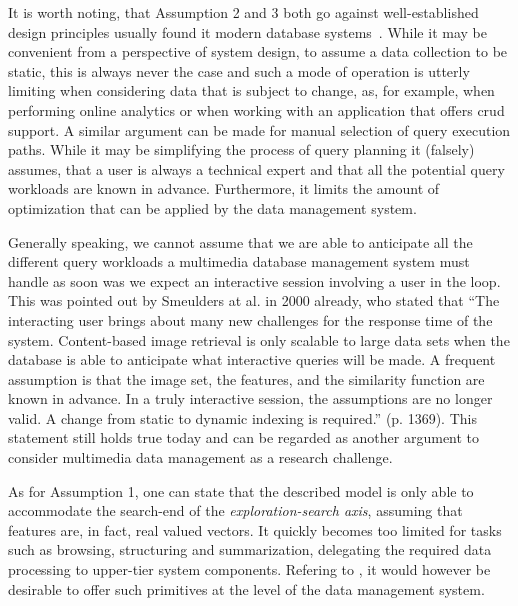 It is worth noting, that Assumption 2 and 3 both go against well-established design principles usually found it modern database systems~\cite{Petrov:2019Database}. While it may be convenient from a perspective of system design, to assume a data collection to be static, this is always never the case and such a mode of operation is utterly limiting when considering data that is subject to change, as, for example, when performing online analytics or when working with an application that offers \acrshort{crud} support. A similar argument can be made for manual selection of query execution paths. While it may be simplifying the process of query planning it (falsely) assumes, that a user is always a technical expert and that all the potential query workloads are known in advance. Furthermore, it limits the amount of optimization that can be applied by the data management system. 

Generally speaking, we cannot assume that we are able to anticipate all the different query workloads a multimedia database management system must handle as soon was we expect an interactive session involving a user in the loop. This was pointed out by Smeulders at al. in 2000 already, who stated that ``The interacting user brings about many new challenges for the response time of the system. Content-based image retrieval is only scalable to large data sets when the database is able to anticipate what interactive queries will be made. A frequent assumption is that the image set, the features, and the similarity function are known in advance. In a truly interactive session, the assumptions are no longer valid. A change from static to dynamic indexing is required.'' \cite{Smeulders:2000Content} (p. 1369). This statement still holds true today and can be regarded as another argument to consider multimedia data management as a research challenge.

As for Assumption 1, one can state that the described model is only able to accommodate the search-end of the \emph{exploration-search axis}, assuming that features are, in fact, real valued vectors. It quickly becomes too limited for tasks such as browsing, structuring and summarization, delegating the required data processing to upper-tier system components. Refering to \cite{Jonson:2016}, it would however be desirable to offer such primitives at the level of the data management system.


